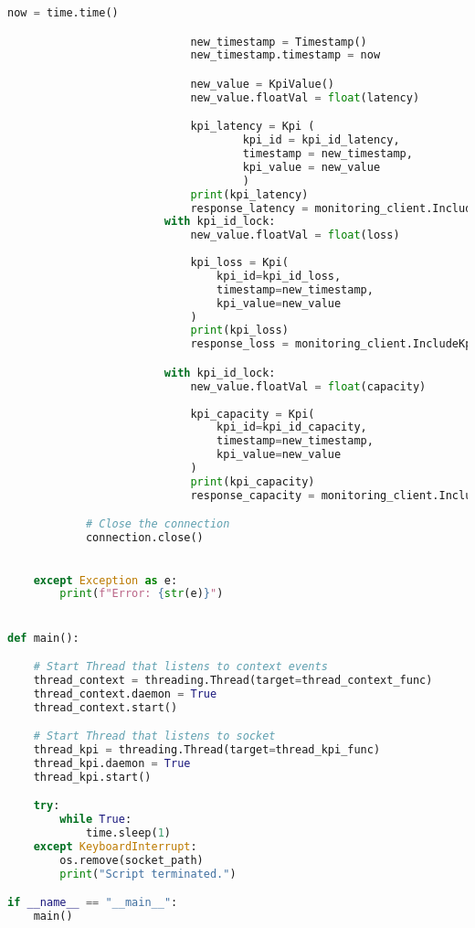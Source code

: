 \begin{lstlisting}[language=Python]
                            now = time.time()

                            new_timestamp = Timestamp()
                            new_timestamp.timestamp = now

                            new_value = KpiValue()
                            new_value.floatVal = float(latency)

                            kpi_latency = Kpi (
                                    kpi_id = kpi_id_latency,
                                    timestamp = new_timestamp,
                                    kpi_value = new_value
                                    )
                            print(kpi_latency)
                            response_latency = monitoring_client.IncludeKpi(kpi_latency) 
                        with kpi_id_lock:
                            new_value.floatVal = float(loss)
                            
                            kpi_loss = Kpi(
                                kpi_id=kpi_id_loss,
                                timestamp=new_timestamp,
                                kpi_value=new_value
                            )
                            print(kpi_loss)
                            response_loss = monitoring_client.IncludeKpi(kpi_loss)

                        with kpi_id_lock:
                            new_value.floatVal = float(capacity)
                            
                            kpi_capacity = Kpi(
                                kpi_id=kpi_id_capacity,
                                timestamp=new_timestamp,
                                kpi_value=new_value
                            )
                            print(kpi_capacity)
                            response_capacity = monitoring_client.IncludeKpi(kpi_capacity)

            # Close the connection 
            connection.close()

    
    except Exception as e:
        print(f"Error: {str(e)}")


def main():

    # Start Thread that listens to context events
    thread_context = threading.Thread(target=thread_context_func)
    thread_context.daemon = True
    thread_context.start()

    # Start Thread that listens to socket
    thread_kpi = threading.Thread(target=thread_kpi_func)
    thread_kpi.daemon = True
    thread_kpi.start()

    try:
        while True:
            time.sleep(1)
    except KeyboardInterrupt:
        os.remove(socket_path)
        print("Script terminated.")

if __name__ == "__main__":
    main()
\end{lstlisting}
